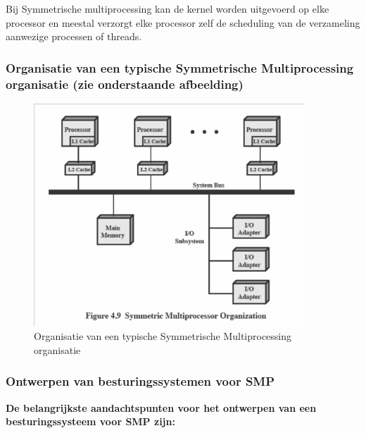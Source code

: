 Bij Symmetrische multiprocessing kan de kernel worden uitgevoerd op elke processor en meestal verzorgt elke processor zelf de scheduling van de verzameling aanwezige processen of threads.

\newpage

\subsubsection{Organisatie van een typische Symmetrische Multiprocessing organisatie (zie onderstaande afbeelding)}
\begin{figure}[htp]
    \centering
            \includegraphics[width=4in]{img/organisatiesymmulti.png}
        \caption{Organisatie van een typische Symmetrische Multiprocessing organisatie}
    \label{fig:Organisatie van een typische Symmetrische Multiprocessing organisatie}
\end{figure}


\subsubsection{Ontwerpen van besturingssystemen voor SMP}

\textbf{De belangrijkste aandachtspunten voor het ontwerpen van een besturingssysteem voor SMP zijn:}

